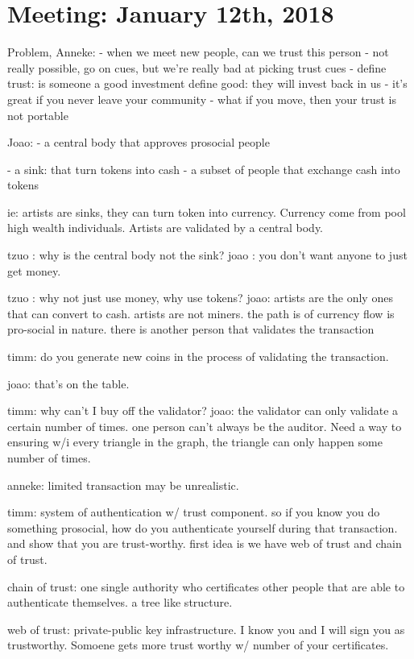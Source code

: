 \section{Meeting: January 12th, 2018}


Problem, Anneke:
	- when we meet new people, can we trust this person
	- not really possible, go on cues, but we're really bad at picking trust cues 
	- define trust: is someone a good investment
		define good: they will invest back in us
	- it's great if you never leave your community
	- what if you move, then your trust is not portable


Joao:
	- a central body that approves prosocial people

	- a sink: that turn tokens into cash 
		- a subset of people that exchange cash into tokens

		ie: artists are sinks, they can turn token into currency. Currency come from pool high wealth individuals. Artists are validated by a central body. 

tzuo : why is the central body not the sink?
joao : you don't want anyone to just get money. 

tzuo : why not just use money, why use tokens?
joao: artists are the only ones that can convert to cash.
	artists are not miners. the path is of currency flow is pro-social in nature. there is another person that validates the transaction

timm: do you generate new coins in the process of validating the transaction.

joao: that's on the table. 

timm: why can't I buy off the validator?
joao: the validator can only validate a certain number of times. one person can't always be the auditor. Need a way to ensuring w/i every triangle in the graph, the triangle can only happen some number of times. 

anneke: limited transaction may be unrealistic.

timm: system of authentication w/ trust component. so if you know you do something prosocial, how do you authenticate yourself during that transaction. and show that you are trust-worthy. first idea is we have web of trust and chain of trust.

chain of trust: one single authority who certificates other people that are able to authenticate themselves. a tree like structure. 

web of trust: private-public key infrastructure. I know you and I will sign you as trustworthy. Somoene gets more trust worthy w/ number of your certificates. 

